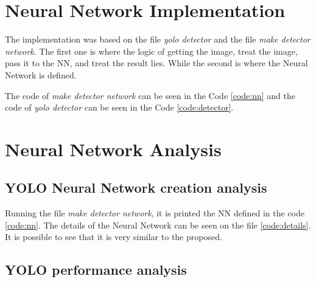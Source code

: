 \documentclass[journal,12pt,onecolumn,draftclsnofoot,]{IEEEtran}
\begin{document}
\section{Neural Network Implementation}

The implementation was based on the file \textit{yolo detector} and the file \textit{make detector network}. The first one is where the logic of getting the image, treat the image, pass it to the NN, and treat the result lies. While the second is where the Neural Network is defined.

The code of \textit{make detector network} can be seen in the Code \ref{code:nn} and the code of \textit{yolo detector} can be seen in the Code \ref{code:detector}.





\section{Neural Network Analysis}
\subsection{YOLO Neural Network creation analysis}

Running the file \textit{make detector network}, it is printed the NN defined in the code \ref{code:nn}. The details of the Neural Network can be seen on the file \ref{code:details}. It is possible to see that it is very similar to the proposed.

\subsection{YOLO performance analysis}
\end{document}
